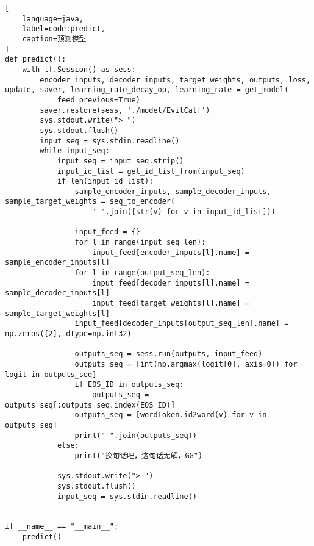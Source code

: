 \begin{appendices}
\begin{lstlisting}[
    language=java,
    label=code:predict,
    caption=预测模型
]
def predict():
    with tf.Session() as sess:
        encoder_inputs, decoder_inputs, target_weights, outputs, loss, update, saver, learning_rate_decay_op, learning_rate = get_model(
            feed_previous=True)
        saver.restore(sess, './model/EvilCalf')
        sys.stdout.write("> ")
        sys.stdout.flush()
        input_seq = sys.stdin.readline()
        while input_seq:
            input_seq = input_seq.strip()
            input_id_list = get_id_list_from(input_seq)
            if len(input_id_list):
                sample_encoder_inputs, sample_decoder_inputs, sample_target_weights = seq_to_encoder(
                    ' '.join([str(v) for v in input_id_list]))

                input_feed = {}
                for l in range(input_seq_len):
                    input_feed[encoder_inputs[l].name] = sample_encoder_inputs[l]
                for l in range(output_seq_len):
                    input_feed[decoder_inputs[l].name] = sample_decoder_inputs[l]
                    input_feed[target_weights[l].name] = sample_target_weights[l]
                input_feed[decoder_inputs[output_seq_len].name] = np.zeros([2], dtype=np.int32)

                outputs_seq = sess.run(outputs, input_feed)
                outputs_seq = [int(np.argmax(logit[0], axis=0)) for logit in outputs_seq]
                if EOS_ID in outputs_seq:
                    outputs_seq = outputs_seq[:outputs_seq.index(EOS_ID)]
                outputs_seq = [wordToken.id2word(v) for v in outputs_seq]
                print(" ".join(outputs_seq))
            else:
                print("换句话吧，这句话无解，GG")

            sys.stdout.write("> ")
            sys.stdout.flush()
            input_seq = sys.stdin.readline()


if __name__ == "__main__":
    predict()

\end{lstlisting}
\end{appendices}